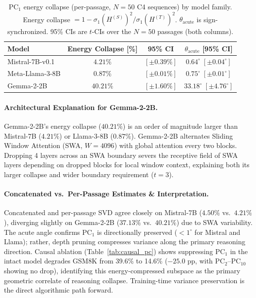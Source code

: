 \documentclass[pmlr,onecolumn]{jmlr}
\begin{document}
{\begin{table}[t!]
\centering
\small
\setlength{\tabcolsep}{4pt}
\caption{PC$_1$ energy collapse (per-passage, $N=50$ C4 sequences) by model family. Energy collapse $= 1 - \sigma_1(H^{(S)})^2/\sigma_1(H^{(T)})^2$. $\theta_{\mathrm{acute}}$ is sign-synchronized. 95\% CIs are $t$-CIs over the $N=50$ passages (both columns).}
\label{tab:energy_full}
\begin{tabular}{lccc}
\toprule
\textbf{Model} & \textbf{Energy Collapse [\%]} & \textbf{95\% CI} & $\theta_{\mathrm{acute}}$ [95\% CI] \\
\midrule
Mistral-7B-v0.1     & $4.21\%$ & $[\pm 0.39\%]$ & $0.64^\circ\; [\pm 0.04^\circ]$ \\
Meta-Llama-3-8B     & $0.87\%$ & $[\pm 0.01\%]$ & $0.75^\circ\; [\pm 0.01^\circ]$ \\
Gemma-2-2B          & $40.21\%$ & $[\pm 1.60\%]$ & $33.18^\circ\; [\pm 4.76^\circ]$ \\
\bottomrule
\end{tabular}
\end{table}

\paragraph{Architectural Explanation for Gemma-2-2B.}
Gemma-2-2B's energy collapse ($40.21\%$) is an order of magnitude larger than Mistral-7B ($4.21\%$) or Llama-3-8B ($0.87\%$). Gemma-2-2B alternates Sliding Window Attention (SWA, $W=4096$) with global attention every two blocks. Dropping 4 layers across an SWA boundary severs the receptive field of SWA layers depending on dropped blocks for local window context, explaining both its larger collapse and wider boundary requirement ($t=3$).

\paragraph{Concatenated vs.\ Per-Passage Estimates \& Interpretation.}
Concatenated and per-passage SVD agree closely on Mistral-7B ($4.50\%$ vs.\ $4.21\%$), diverging slightly on Gemma-2-2B ($37.13\%$ vs.\ $40.21\%$) due to SWA variability. The acute angle confirms $\mathrm{PC}_1$ is directionally preserved ($< 1^\circ$ for Mistral and Llama); rather, depth pruning compresses variance along the primary reasoning direction. Causal ablation (Table~\ref{tab:causal_pc}) shows suppressing $\mathrm{PC}_1$ in the intact model degrades GSM8K from 39.6\% to 14.6\% ($-25.0$ pp, with $\mathrm{PC}_2$--$\mathrm{PC}_{10}$ showing no drop), identifying this energy-compressed subspace as the primary geometric correlate of reasoning collapse. Training-time variance preservation is the direct algorithmic path forward.
} %
\end{document}
